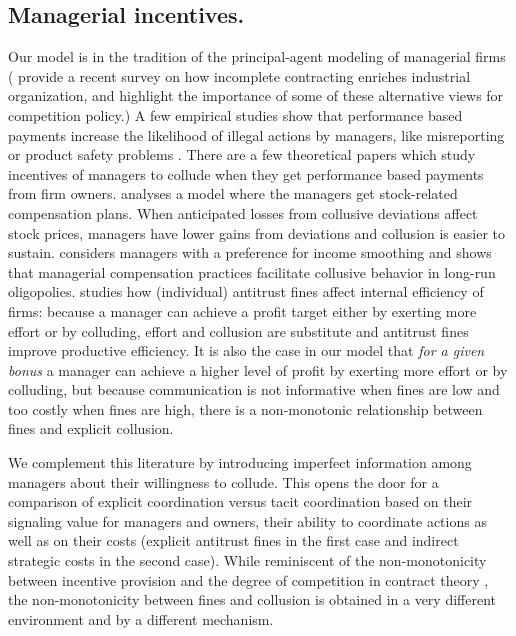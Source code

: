 \documentclass[]{article}
\begin{document}
\subsection{Managerial incentives.} Our model is in the tradition of the principal-agent modeling of managerial firms (\citealp{LegrosNewman-survey2014} provide a recent survey on how incomplete contracting enriches industrial organization, and \citealp{Thepot2019} highlight the importance of some of these alternative views for competition policy.) A few empirical studies show that performance based payments increase the likelihood of illegal actions by managers, like misreporting \citep{burns2006, bergstresser2006} or product safety problems \citep{wowak2015}. There are a few theoretical papers which study incentives of managers to collude when they get performance based payments from firm owners. \cite{spagnolo2000} analyses a model where the managers get stock-related compensation plans. When anticipated losses from collusive deviations affect stock prices, managers have lower gains from deviations and collusion is easier to sustain. \cite{spagnolo2005} considers managers with a preference for income smoothing and shows that managerial compensation practices facilitate collusive behavior in long-run oligopolies. \cite{aubert2009} studies how (individual) antitrust fines affect internal efficiency of firms: because a manager can achieve a profit target either by exerting more effort or by colluding, effort and collusion are substitute and antitrust fines improve productive efficiency. It is also the case in our model that \emph{for a given bonus} a manager can achieve a higher level of profit by exerting more effort or by colluding, but because communication is not informative when fines are low and too costly when fines are high, there is a non-monotonic relationship between fines and explicit collusion.

We complement this literature by introducing imperfect information among managers about their willingness to collude. This opens the door for a comparison of explicit coordination versus tacit coordination based on their signaling value for managers and owners, their ability to coordinate actions as well as on their costs (explicit antitrust fines in the first case and indirect strategic costs in the second case). While reminiscent of the non-monotonicity between incentive provision and the degree of competition in contract theory \citep{Schmidt1997}, the non-monotonicity between fines and collusion is obtained in a very different environment and by a different mechanism. 
\end{document}
